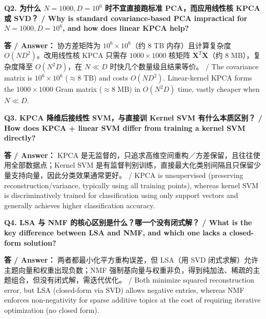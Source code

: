 \textbf{Q2. 为什么 $N=1000, D=10^6$ 时不宜直接跑标准 PCA，而应用线性核 KPCA 或 SVD？ / Why is standard covariance-based PCA impractical for $N=1000, D=10^6$, and how does linear KPCA help?}

\textbf{答 / Answer：} 协方差矩阵为 $10^6\times 10^6$（约 8 TB 内存）且计算复杂度 $O(ND^2)$。改用线性核 KPCA 只需存 $1000\times 1000$ 核矩阵 $\mathbf{X}^T\mathbf{X}$（约 8 MB），复杂度降至 $O(N^2D)$，在 $N\ll D$ 时快几个数量级且结果等价。 / The covariance matrix is $10^6\times 10^6$ ($\approx 8\text{ TB}$) and costs $O(ND^2)$. Linear-kernel KPCA forms the $1000\times 1000$ Gram matrix ($\approx 8\text{ MB}$) in $O(N^2D)$ time, vastly cheaper when $N\ll D$.

\textbf{Q3. KPCA 降维后接线性 SVM，与直接训 Kernel SVM 有什么本质区别？ / How does KPCA + linear SVM differ from training a kernel SVM directly?}

\textbf{答 / Answer：} KPCA 是无监督的，只追求高维空间重构／方差保留，且往往使用全部数据点；Kernel SVM 是有监督判别训练，直接最大化类别间隔且只保留少量支持向量，因此分类效果通常更好。 / KPCA is unsupervised (preserving reconstruction/variance, typically using all training points), whereas kernel SVM is discriminatively trained for classification using only support vectors and generally achieves higher classification accuracy.

\textbf{Q4. LSA 与 NMF 的核心区别是什么？哪一个没有闭式解？ / What is the key difference between LSA and NMF, and which one lacks a closed-form solution?}

\textbf{答 / Answer：} 两者都最小化平方重构误差，但 LSA（用 SVD 闭式求解）允许主题向量和权重出现负数；NMF 强制基向量与权重非负，得到纯加法、稀疏的主题组合，但没有闭式解，需迭代优化。 / Both minimize squared reconstruction error, but LSA (closed-form via SVD) allows negative entries, whereas NMF enforces non-negativity for sparse additive topics at the cost of requiring iterative optimization (no closed form).



